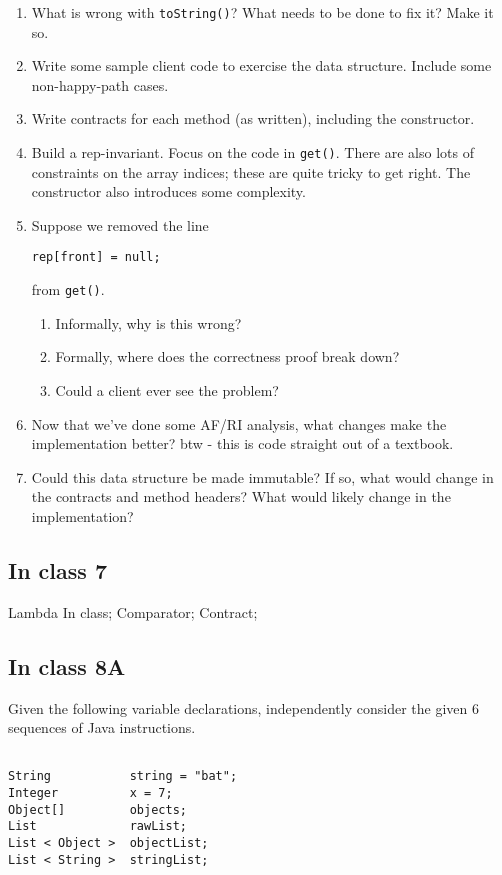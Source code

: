 \documentclass[11pt]{article}
\begin{document}
\begin{enumerate}
\item What is wrong with \texttt{toString()}? What needs to be done to fix it? Make it so.
\item Write some sample client code to exercise the data structure. Include some non-happy-path cases.
\item Write contracts for each method (as written), including the constructor.
\item Build a rep-invariant. Focus on the code in \texttt{get()}. There are also lots of constraints on the array indices; these are quite tricky to get right. The constructor also introduces some complexity.
\item Suppose we removed the line
\begin{verbatim}
rep[front] = null;       
\end{verbatim}
from \texttt{get()}.
\begin{enumerate}
\item Informally, why is this wrong?
\item Formally, where does the correctness proof break down?
\item Could a client ever see the problem?
\end{enumerate}
\item Now that we've done some AF/RI analysis, what changes make the implementation better? btw - this is code straight out of a textbook.
\item Could this data structure be made immutable? If so, what would change in the contracts and method headers? What would likely change in the implementation?
\end{enumerate}

\subsection{In class 7}
\label{sec:org32be849}
Lambda In class;
Comparator;
Contract;

\subsection{In class 8A}
\label{sec:org9f29a82}
Given the following variable declarations, independently consider the given 6 sequences of Java instructions.
\begin{verbatim}

String           string = "bat";
Integer          x = 7;
Object[]         objects;
List             rawList;
List < Object >  objectList;
List < String >  stringList;

\end{verbatim}
\end{document}
